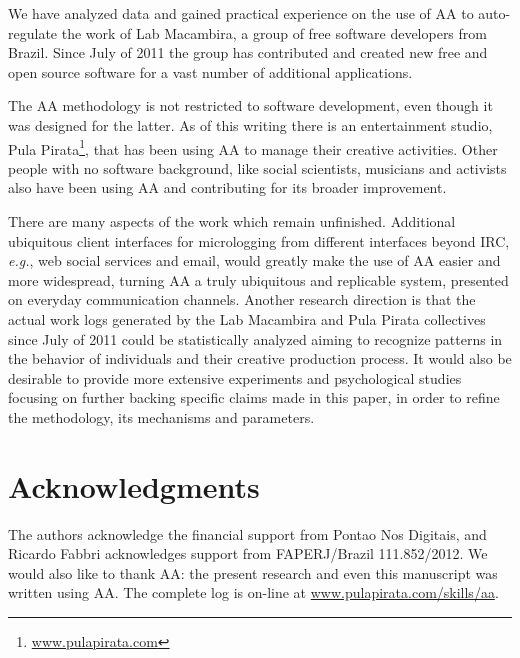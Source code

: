 \documentclass{article}
\newcommand{\eg}{{\it e.g.}}
\begin{document}
We have analyzed data and gained practical experience on
the use of AA to auto-regulate the work of Lab Macambira, a group of free
software developers from Brazil. Since July of 2011 the group has contributed
and created new free and open source software for a vast number of additional applications.

The AA methodology is not restricted to software development, even though it was
designed for the latter. As of this writing there is an entertainment studio,
Pula Pirata\footnote{ \url{www.pulapirata.com}}, that has been using AA to
manage their creative activities.  Other people with no software background,
like social scientists, musicians and activists also have been using AA and
contributing for its broader improvement.

There are many aspects of the work which remain unfinished. Additional
ubiquitous client interfaces for micrologging from different interfaces beyond
IRC, \eg, web social services and email, would greatly make the use of AA easier
and more widespread, turning AA a truly ubiquitous and replicable system,
presented on everyday communication channels. Another research direction is that
the actual work logs generated by the Lab Macambira and Pula Pirata collectives
since July of 2011 could be statistically analyzed aiming to recognize
patterns in the behavior of individuals and their creative production process.
It would also be desirable to provide more extensive experiments and
psychological studies focusing on further backing specific claims made in this
paper, in order to refine the methodology, its mechanisms and parameters.

\section*{Acknowledgments}
The authors acknowledge the financial support from Pontao Nos Digitais, and
Ricardo Fabbri acknowledges support from FAPERJ/Brazil 111.852/2012.
We would also like to thank AA: the present research and even this
manuscript was written using AA. The complete log is on-line at
\url{www.pulapirata.com/skills/aa}.

\nocite{last2003}
\nocite{german2003}
\nocite{carmel1999}
\nocite{carmel2001}
\nocite{komi2005}
\nocite{battin2001}

%
%


\end{document}
